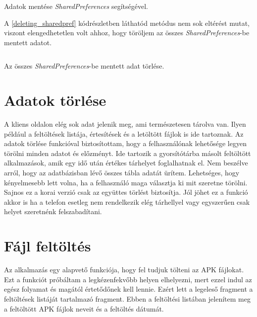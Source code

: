 \documentclass{thesis-ekf}
\theoremstyle{definition}
\theoremstyle{remark}
\begin{document}
\begin{listing}[ht]
	\inputminted[linenos=true, breaklines]{java}{./codes/saving_sharedpref.java}
	\caption{Adatok mentése \emph{SharedPreferences} segítségével.}
	\label{saving_sharedpref}
\end{listing}

A \ref{deleting_sharedpref} kódrészletben láthatód metódus nem sok eltérést mutat, viszont elengedhetetlen volt ahhoz, hogy töröljem az összes \emph{SharedPreferences}-be mentett adatot.

\begin{listing}[ht]
	\inputminted[linenos=true, breaklines]{java}{./codes/deleting_sharedprefs.java}
	\caption{Az összes \emph{SharedPreferences}-be mentett adat törlése.}
	\label{deleting_sharedpref}
\end{listing}

\section{Adatok törlése}

A kliens oldalon elég sok adat jelenik meg, ami természetesen tárolva van.
Ilyen például a feltöltések listája, értesítések és a letöltött fájlok is ide tartoznak.
Az adatok törlése funkcióval biztosítottam, hogy a felhasználónak lehetősége legyen törölni minden adatot és előzményt.
Ide tartozik a gyorsítótárba másolt feltöltött alkalmazások, amik egy idő után értékes tárhelyet foglalhatnak el.
Nem beszélve arról, hogy az adatbázisban lévő összes tábla adatát ürítem.
Lehetséges, hogy kényelmesebb lett volna, ha a felhasználó maga választja ki mit szeretne törölni.
Sajnos ez a korai verzió csak az együttes törlést biztosítja.
Jól jöhet ez a funkció akkor is ha a telefon esetleg nem rendelkezik elég tárhellyel vagy egyszerűen csak helyet szeretnénk felszabadítani.

\section{Fájl feltöltés}

Az alkalmazás egy alapvető funkciója, hogy fel tudjuk tölteni az APK fájlokat.
Ezt a funkciót próbáltam a legkézenfekvőbb helyen elhelyezni, mert ezzel indul az egész folyamat és magától értetődőnek kell lennie.
Ezért lett a legeleső fragment a feltöltések listáját tartalmazó fragment.
Ebben a feltöltési listában jelenítem meg a feltöltött APK fájlok neveit és a feltöltés dátumát.
\end{document}
